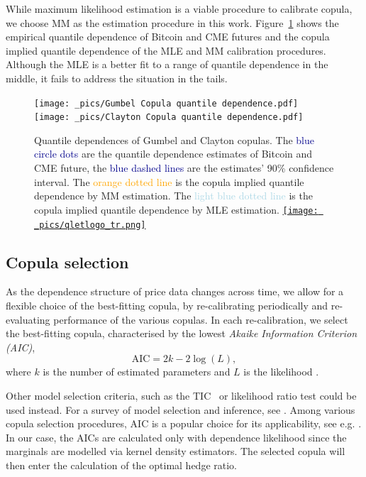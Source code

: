 While maximum likelihood estimation is a viable procedure to calibrate copula, 
we choose MM as the estimation procedure in this work. 
Figure~\ref{fig:quantile dependence1} shows the empirical quantile
dependence of Bitcoin and CME futures and the copula implied quantile
dependence of the MLE and MM calibration procedures. 
Although the MLE is a better fit to a range of quantile dependence in
the middle, it fails to address the situation in the tails. 

\begin{figure}[h]
\texttt{[image: \_pics/Gumbel Copula quantile dependence.pdf]}
\texttt{[image: \_pics/Clayton Copula quantile dependence.pdf]}
  \caption{Quantile dependences of Gumbel and Clayton copulas. The
    \textcolor{darkblue}{blue circle dots} are the quantile dependence
    estimates of Bitcoin and CME future, the \textcolor{darkblue}{blue
      dashed lines} are the estimates' 90\% confidence interval. 
  The \textcolor{orange}{orange dotted line} is the copula implied
  quantile dependence by MM estimation. The
  \textcolor{lightblue}{light blue dotted line} is the copula implied
  quantile dependence by MLE estimation.  
  \href{https://github.com/QuantLet/Hedging-Cryptos-with-Bitcoin-Futures/blob/main/newToQuantlet/Pynotebooks/figures/figure 2.ipynb}{\texttt{[image: \_pics/qletlogo\_tr.png]}}}
  
\label{fig:quantile dependence1}
\end{figure}

\subsection{Copula selection}\label{subsec:copula-selection}
As the dependence structure of price data changes
across time, we allow for a flexible choice of the best-fitting
copula, by re-calibrating periodically and re-evaluating performance
of the various copulas. 
In each re-calibration, we select the best-fitting
copula, characterised by the lowest {\em Akaike Information Criterion
  (AIC)},
\begin{equation*}
 \text{AIC} = 2k- 2 \log(L),
\end{equation*}
where $k$ is the number of estimated
parameters and $L$ is the likelihood \citep{Akaike1973}. 

Other model selection criteria, such as the TIC~\citep{takeuchi1976distribution} or likelihood ratio test could be used instead.
For a survey of model selection and inference, see \cite{anderson1998comparison}.
Among various copula selection procedures, AIC is a popular choice for
its applicability, see e.g. \cite{breymann2003dependence}.
In our case, the AICs are calculated only with dependence likelihood
since the marginals are modelled via kernel density estimators.
The selected copula will then enter the calculation of the optimal
hedge ratio.

